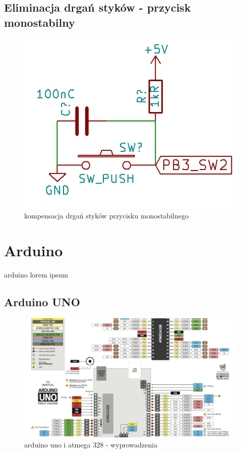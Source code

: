 \documentclass{article}
\begin{document}
\subsection{Eliminacja drgań styków - przycisk monostabilny}

\begin{figure}[H]
	\center
	\includegraphics[scale=0.8]{img/przycisk-mono.jpg}
	\caption{kompensacja drgań styków przycisku monostabilnego}
	\label{fig:img5}
\end{figure}

\section{Arduino}
arduino lorem ipsum

\subsection{Arduino UNO}

\begin{figure}[H]
	\center
	\includegraphics[scale=0.4]{img/arduino-pinout.png}
	\caption{arduino uno i atmega 328 - wyprowadzenia}
	\label{fig:img6}
\end{figure}
\end{document}
